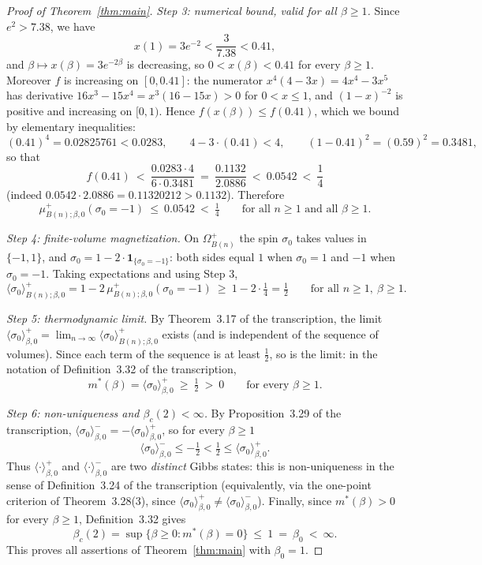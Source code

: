\documentclass[11pt]{article}
\theoremstyle{plain}
\theoremstyle{definition}
\theoremstyle{remark}
\newcommand{\sg}{\sigma}
\newcommand{\avg}[1]{\langle #1 \rangle}
\newcommand{\meanp}[1]{\langle #1 \rangle^{+}}
\newcommand{\meanm}[1]{\langle #1 \rangle^{-}}
\begin{document}
\begin{proof}[Proof of Theorem~\ref{thm:main}]
\medskip\noindent
\emph{Step 3: numerical bound, valid for all $\beta\ge1$.} Since
$e^{2}>7.38$, we have
\[
  x(1)=3e^{-2}<\frac{3}{7.38}<0.41,
\]
and $\beta\mapsto x(\beta)=3e^{-2\beta}$ is decreasing, so
$0<x(\beta)<0.41$ for every $\beta\ge1$. Moreover $f$ is increasing on
$[0,0.41]$: the numerator $x^{4}(4-3x)=4x^{4}-3x^{5}$ has derivative
$16x^{3}-15x^{4}=x^{3}(16-15x)>0$ for $0<x\le1$, and $(1-x)^{-2}$ is positive
and increasing on $[0,1)$. Hence $f(x(\beta))\le f(0.41)$, which we bound by
elementary inequalities:
\[
  (0.41)^{4}=0.02825761<0.0283,\qquad
  4-3\cdot(0.41)<4,\qquad
  (1-0.41)^{2}=(0.59)^{2}=0.3481,
\]
so that
\[
  f(0.41)\ <\ \frac{0.0283\cdot 4}{6\cdot 0.3481}
          \ =\ \frac{0.1132}{2.0886}\ <\ 0.0542\ <\ \frac14
\]
(indeed $0.0542\cdot2.0886=0.11320212>0.1132$). Therefore
\[
  \mu^{+}_{B(n);\beta,0}(\sg_0=-1)\ \le\ 0.0542\ <\ \tfrac14
  \qquad\text{for all } n\ge1 \text{ and all } \beta\ge1 .
\]

\medskip\noindent
\emph{Step 4: finite-volume magnetization.} On $\Omega^{+}_{B(n)}$ the spin
$\sg_0$ takes values in $\{-1,1\}$, and
$\sg_0=1-2\cdot\mathbf{1}_{\{\sg_0=-1\}}$: both sides equal $1$ when
$\sg_0=1$ and $-1$ when $\sg_0=-1$. Taking expectations and using Step 3,
\[
  \avg{\sg_0}^{+}_{B(n);\beta,0}
  =1-2\,\mu^{+}_{B(n);\beta,0}(\sg_0=-1)
  \ \ge\ 1-2\cdot\tfrac14=\tfrac12
  \qquad\text{for all } n\ge1,\ \beta\ge1 .
\]

\medskip\noindent
\emph{Step 5: thermodynamic limit.} By Theorem~3.17 of the transcription, the
limit
$\meanp{\sg_0}_{\beta,0}=\lim_{n\to\infty}\avg{\sg_0}^{+}_{B(n);\beta,0}$
exists (and is independent of the sequence of volumes). Since each term of
the sequence is at least $\tfrac12$, so is the limit: in the notation of
Definition~3.32 of the transcription,
\[
  m^*(\beta)=\meanp{\sg_0}_{\beta,0}\ \ge\ \tfrac12\ >\ 0
  \qquad\text{for every }\beta\ge1 .
\]

\medskip\noindent
\emph{Step 6: non-uniqueness and $\beta_c(2)<\infty$.} By Proposition~3.29 of
the transcription, $\meanm{\sg_0}_{\beta,0}=-\meanp{\sg_0}_{\beta,0}$, so for
every $\beta\ge1$
\[
  \meanm{\sg_0}_{\beta,0}\le-\tfrac12<\tfrac12\le\meanp{\sg_0}_{\beta,0}.
\]
Thus $\meanp{\cdot}_{\beta,0}$ and $\meanm{\cdot}_{\beta,0}$ are two
\emph{distinct} Gibbs states: this is non-uniqueness in the sense of
Definition~3.24 of the transcription (equivalently, via the one-point
criterion of Theorem~3.28(3), since
$\meanp{\sg_0}_{\beta,0}\neq\meanm{\sg_0}_{\beta,0}$). Finally, since
$m^*(\beta)>0$ for every $\beta\ge1$, Definition~3.32 gives
\[
  \beta_c(2)=\sup\{\beta\ge0:m^*(\beta)=0\}\ \le\ 1\ =\ \beta_0\ <\ \infty .
\]
This proves all assertions of Theorem~\ref{thm:main} with $\beta_0=1$.
\end{proof}
\end{document}
